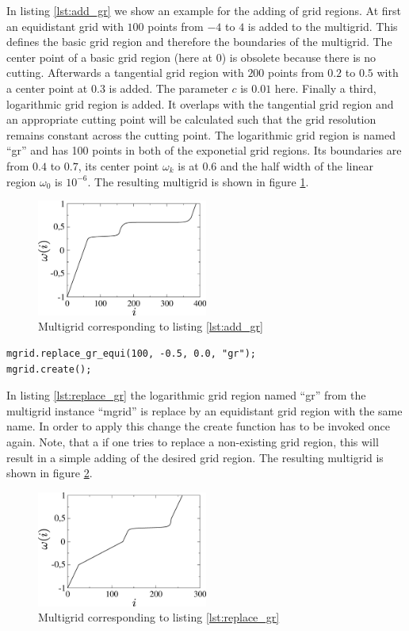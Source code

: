 In listing \ref{lst:add_gr} we show an example for the adding of grid regions. At first an equidistant grid with $100$ points from $-4$ to $4$ is added to the multigrid. This defines the basic grid region and therefore the boundaries of the multigrid. The center point of a basic grid region (here at $0$) is obsolete because there is no cutting. Afterwards a tangential grid region with $200$ points from $0.2$ to $0.5$ with a center point at $0.3$ is added. The parameter $c$ is $0.01$ here. Finally a third, logarithmic grid region is added. It overlaps with the tangential grid region and an appropriate cutting point will be calculated such that the grid resolution remains constant across the cutting point. The logarithmic grid region is named   ``gr'' and has 100 points in both of the exponetial grid regions. Its boundaries are from $0.4$ to $0.7$, its center point $\omega_k$ is at $0.6$ and the half width of the linear region $\omega_0$ is $10^{-6}$. The resulting multigrid is shown in figure \ref{fig:example_add_gr}.
\begin{figure}[h]
	\centering
	\includegraphics[width=0.5\textwidth]{pics/example_add_gr.eps}
	\caption{Multigrid corresponding to listing \ref{lst:add_gr}}
	\label{fig:example_add_gr}
\end{figure}

\begin{lstlisting}[caption={Example for replacing a grid region},label={lst:replace_gr}]
mgrid.replace_gr_equi(100, -0.5, 0.0, "gr");
mgrid.create();
\end{lstlisting}

In listing \ref{lst:replace_gr} the logarithmic grid region named ``gr'' from the multigrid instance ``mgrid'' is replace by an equidistant grid region with the same name. In order to apply this change the create function has to be invoked once again. Note, that a if one tries to replace a non-existing grid region, this will result in a simple adding of the desired grid region. The resulting multigrid is shown in figure \ref{fig:example_replace_gr}.
\begin{figure}[h]
	\centering
	\includegraphics[width=0.5\textwidth]{pics/example_replace_gr.eps}
	\caption{Multigrid corresponding to listing \ref{lst:replace_gr}}
	\label{fig:example_replace_gr}
\end{figure}

